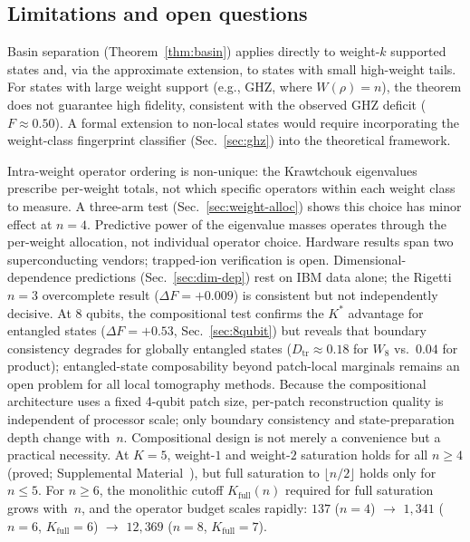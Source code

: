 \documentclass[twocolumn,prx,aps,superscriptaddress,longbibliography,floatfix]{revtex4-2}
\begin{document}
\subsection{Limitations and open questions}
\label{sec:limitations}

Basin separation (Theorem~\ref{thm:basin}) applies
directly to weight-$k$ supported states and, via the approximate extension, to
states with small high-weight tails.  For states with large weight
support (e.g., GHZ, where $W(\rho) = n$), the theorem does not
guarantee high fidelity, consistent with the observed GHZ deficit
($F \approx 0.50$).  A formal extension to non-local states would
require incorporating the weight-class fingerprint classifier
(Sec.~\ref{sec:ghz}) into the theoretical framework.

Intra-weight operator ordering is non-unique: the Krawtchouk
eigenvalues prescribe per-weight totals, not which specific
operators within each weight class to measure.  A three-arm test
(Sec.~\ref{sec:weight-alloc}) shows this choice has minor effect
at $n = 4$.  Predictive power of the eigenvalue masses operates
through the per-weight allocation, not individual operator
choice.
Hardware results span two superconducting vendors; trapped-ion
verification is open.
Dimensional-dependence predictions (Sec.~\ref{sec:dim-dep})
rest on IBM data alone; the Rigetti $n = 3$ overcomplete result
($\Delta F = +0.009$) is consistent but not independently
decisive.
At 8 qubits, the compositional test confirms the $K^*$ advantage for
entangled states ($\Delta F = +0.53$, Sec.~\ref{sec:8qubit}) but
reveals that boundary consistency degrades for globally entangled
states ($D_\mathrm{tr} \approx 0.18$ for $W_8$ vs.\
$0.04$ for product); entangled-state composability beyond
patch-local marginals remains an open problem for all local
tomography methods.
Because the compositional architecture uses a fixed 4-qubit patch
size, per-patch reconstruction quality is independent of processor
scale; only boundary consistency and state-preparation depth change
with~$n$.
Compositional design is not merely a convenience but a
practical necessity.
At $K = 5$, weight-$1$ and weight-$2$ saturation holds for all
$n \ge 4$ (proved; Supplemental Material~\cite{supplemental}),
but full saturation to $\lfloor n/2 \rfloor$ holds only for
$n \le 5$.
For $n \ge 6$, the monolithic cutoff $K_{\mathrm{full}}(n)$
required for full saturation grows with~$n$, and the operator
budget scales rapidly:
$137$ ($n{=}4$) $\to$ $1{,}341$ ($n{=}6$, $K_{\mathrm{full}}{=}6$)
$\to$ $12{,}369$ ($n{=}8$, $K_{\mathrm{full}}{=}7$).
\end{document}

